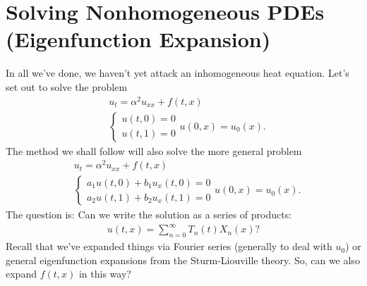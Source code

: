 \documentclass{book}
\theoremstyle{definition}
\begin{document}
\newpage

\chapter{Solving Nonhomogeneous PDEs (Eigenfunction Expansion)}
In all we've done, we haven't yet attack an inhomogeneous heat equation. Let's set out to solve the problem 
\begin{align*}
&u_t = \alpha^2 u_{xx} + f(t,x)\\
&\begin{cases}
u(t,0) = 0\\
u(t,1) = 0
\end{cases}
u(0,x) = u_0(x).
\end{align*}
The method we shall follow will also solve the more general problem 
\begin{align*}
&u_t = \alpha^2 u_{xx} + f(t,x)\\
&\begin{cases}
a_1u(t,0) + b_1u_x(t,0) = 0\\
a_2u(t,1) + b_2u_x(t,1) = 0
\end{cases}
u(0,x) = u_0(x).
\end{align*}
The question is: Can we write the solution as a series of products:
\begin{align*}
u(t,x) = \sum^\infty_{n=0}T_n(t)X_n(x)?
\end{align*}
Recall that we've expanded things via Fourier series (generally to deal with $u_0$) or general eigenfunction expansions from the Sturm-Liouville theory. So, can we also expand $f(t,x)$ in this way?\\
\end{document}

